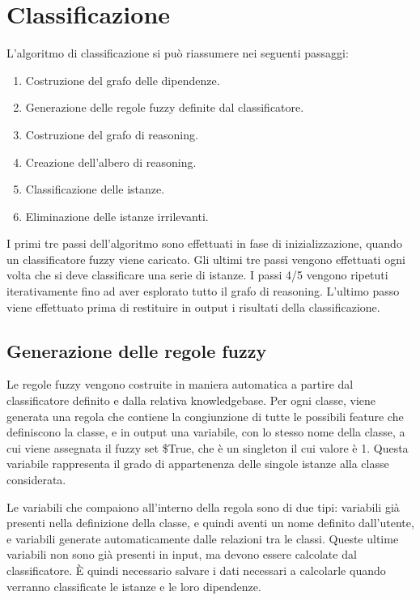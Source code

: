 \section{Classificazione}

L'algoritmo di classificazione si può riassumere nei seguenti passaggi:

\begin{enumerate} 
 \item Costruzione del grafo delle dipendenze.
 \item Generazione delle regole fuzzy definite dal classificatore.
 \item Costruzione del grafo di reasoning.
 \item Creazione dell'albero di reasoning.
 \item Classificazione delle istanze.
 \item Eliminazione delle istanze irrilevanti.
\end{enumerate}

I primi tre passi dell'algoritmo sono effettuati in fase di inizializzazione, quando un classificatore fuzzy viene caricato.
Gli ultimi tre passi vengono effettuati ogni volta che si deve classificare una serie di istanze.
I passi 4/5 vengono ripetuti iterativamente fino ad aver esplorato tutto il grafo di reasoning.
L'ultimo passo viene effettuato prima di restituire in output i risultati della classificazione.

\subsection{Generazione delle regole fuzzy}

Le regole fuzzy vengono costruite in maniera automatica a partire dal classificatore definito e dalla relativa knowledgebase. Per ogni classe, viene generata una regola che contiene la congiunzione di tutte le possibili feature che definiscono la classe, e in output una variabile, con lo stesso nome della classe, a cui viene assegnata il fuzzy set \$True, che è un singleton il cui valore è 1. Questa variabile rappresenta il grado di appartenenza delle singole istanze alla classe considerata.

Le variabili che compaiono all'interno della regola sono di due tipi: variabili già presenti nella definizione della classe, e quindi aventi un nome definito dall'utente, e variabili generate automaticamente dalle relazioni tra le classi. Queste ultime variabili non sono già presenti in input, ma devono essere calcolate dal classificatore. \`E quindi necessario salvare i dati necessari a calcolarle quando verranno classificate le istanze e le loro dipendenze.

